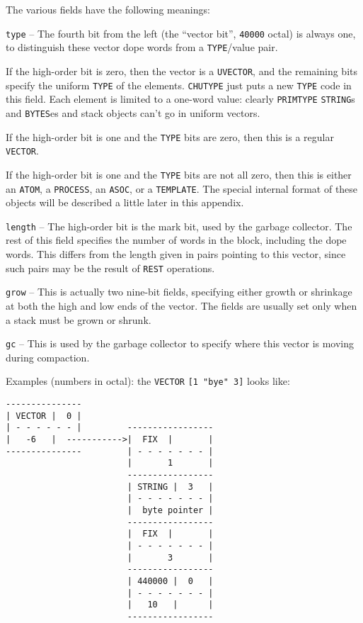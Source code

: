 \documentclass[a4paper]{scrbook}
\begin{document}
The various fields have the following meanings:

\texttt{type} -- The fourth bit from the left (the ``vector bit'', \texttt{40000} octal) is always one, to distinguish
these vector dope words from a \texttt{TYPE}/value pair.

If the high-order bit is zero, then the vector is a \texttt{UVECTOR}, and the remaining bits
specify the uniform \texttt{TYPE} of the elements. \texttt{CHUTYPE} just puts a new \texttt{TYPE}
code in this field. Each element is limited to a one-word value: clearly \texttt{PRIMTYPE} \texttt{STRING}s and
\texttt{BYTES}es and stack objects can't go in uniform vectors.

If the high-order bit is one and the \texttt{TYPE} bits are zero, then this is a regular
\texttt{VECTOR}.

If the high-order bit is one and the \texttt{TYPE} bits are not all zero, then this is either an \texttt{ATOM}, a
\texttt{PROCESS}, an \texttt{ASOC}, or a \texttt{TEMPLATE}. The special internal format of these
objects will be described a little later in this appendix.

\texttt{length} -- The high-order bit is the mark bit, used by the garbage collector. The rest of this field specifies the
number of words in the block, including the dope words. This differs from the length given in pairs pointing to this
vector, since such pairs may be the result of \texttt{REST} operations.

\texttt{grow} -- This is actually two nine-bit fields, specifying either growth or shrinkage at both the high and low ends
of the vector. The fields are usually set only when a stack must be grown or shrunk.

\texttt{gc} -- This is used by the garbage collector to specify where this vector is moving during compaction.

Examples (numbers in octal): the \texttt{VECTOR} \texttt{{[}1\ "bye"\ 3{]}} looks like:

\begin{verbatim}
---------------
| VECTOR |  0 |
| - - - - - - |         -----------------
|   -6   |  ----------->|  FIX  |       |
---------------         | - - - - - - - |
                        |       1       |
                        -----------------
                        | STRING |  3   |
                        | - - - - - - - |
                        |  byte pointer |
                        -----------------
                        |  FIX  |       |
                        | - - - - - - - |
                        |       3       |
                        -----------------
                        | 440000 |  0   |
                        | - - - - - - - |
                        |   10   |      |
                        -----------------
\end{verbatim}
\end{document}
